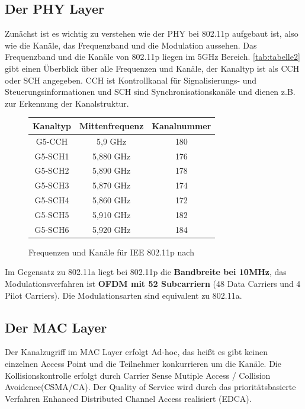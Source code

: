 \documentclass[letterpaper,11pt]{article}
\begin{document}
\begin{onehalfspace}
\subsection{Der PHY Layer}
Zunächst ist es wichtig zu verstehen wie der PHY bei 802.11p aufgebaut ist, also wie die Kanäle, das Frequenzband und die Modulation aussehen.
Das Frequenzband und die Kanäle von 802.11p liegen im 5GHz Bereich. \autoref{tab:tabelle2} gibt einen Überblick über alle Frequenzen und Kanäle, der Kanaltyp ist als CCH oder SCH angegeben. CCH ist Kontrollkanal für Signalisierungs- und Steuerungsinformationen und SCH sind Synchronisationskanäle und dienen z.B. zur Erkennung der Kanalstruktur.
\begin{figure}[H]
\begin{center}
\begin{tabular}{|c|c|c|}\hline
\small
  \textbf{Kanaltyp} & \textbf{Mittenfrequenz}  & \textbf{Kanalnummer} \\ \hline
  G5-CCH & 5,9 GHz & 180 \\\hline
  G5-SCH1 & 5,880 GHz & 176 \\\hline
  G5-SCH2 & 5,890 GHz & 178 \\\hline
  G5-SCH3 & 5,870 GHz & 174 \\\hline 
  G5-SCH4 & 5,860 GHz & 172 \\\hline
  G5-SCH5 & 5,910 GHz & 182 \\\hline
  G5-SCH6 & 5,920 GHz & 184 \\\hline
 \end{tabular}
 \caption{Frequenzen und Kanäle für IEE 802.11p nach  \cite{[6]}}
  \label{tab:tabelle2}
  \end{center}
 \end{figure}
\noindent Im Gegensatz zu 802.11a liegt bei 802.11p die \textbf{Bandbreite bei 10MHz}, das Modulationsverfahren ist \textbf{OFDM mit 52 Subcarriern} (48 Data Carriers und 4 Pilot Carriers). Die Modulationsarten sind equivalent zu 802.11a.
\cite{[6]}
\subsection{Der MAC Layer}
Der Kanalzugriff im MAC Layer erfolgt Ad-hoc, das heißt es gibt keinen einzelnen Access Point und die Teilnehmer konkurrieren um die Kanäle. Die Kollisionskontrolle erfolgt durch Carrier Sense Mutiple Access / Collision Avoidence(CSMA/CA). Der Quality of Service wird durch das prioritätsbasierte Verfahren Enhanced Distributed Channel Access realisiert (EDCA). 


\end{onehalfspace}
\end{document}
